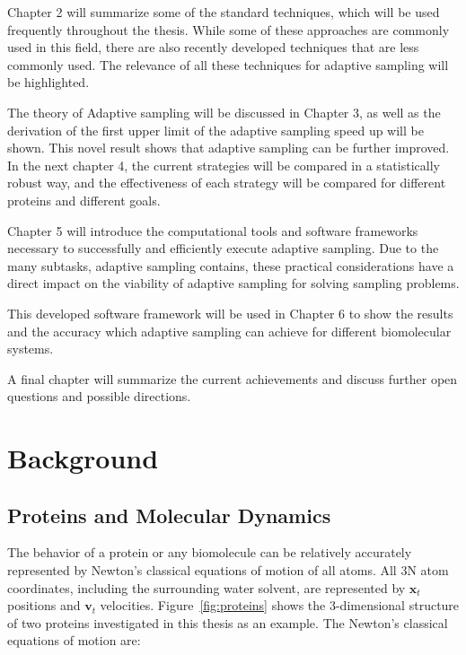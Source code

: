 Chapter 2 will summarize some of the standard techniques, which will be used frequently throughout the thesis. While some of these approaches are commonly used in this field, there are also recently developed techniques that are less commonly used. The relevance of all these techniques for adaptive sampling will be highlighted. 

The theory of Adaptive sampling will be discussed in Chapter 3, as well as the derivation of the first upper limit of the adaptive sampling speed up will be shown. This novel result shows that adaptive sampling can be further improved. 
In the next chapter 4, the current strategies will be compared in a statistically robust way, and the effectiveness of each strategy will be compared for different proteins and different goals.

Chapter 5 will introduce the computational tools and software frameworks necessary to successfully and efficiently execute adaptive sampling. Due to the many subtasks, adaptive sampling contains, these practical considerations have a direct impact on the viability of adaptive sampling for solving sampling problems.

This developed software framework will be used in Chapter 6 to show the results and the accuracy which adaptive sampling can achieve for different biomolecular systems. 

A final chapter will summarize the current achievements and discuss further open questions and possible directions.




\afterpage{\null\newpage}
\chapter{Background\label{sec:background}}

\section{Proteins and Molecular Dynamics}

The behavior of a protein or any biomolecule can be relatively accurately represented by Newton's classical equations of motion of all atoms. All 3N atom coordinates, including the surrounding water solvent, are represented by $\mathbf{x}_{t}$ positions and $\mathbf{v}_{t}$ velocities. Figure~\ref{fig:proteins} shows the 3-dimensional structure of two proteins investigated in this thesis as an example. The Newton's classical equations of motion are:

